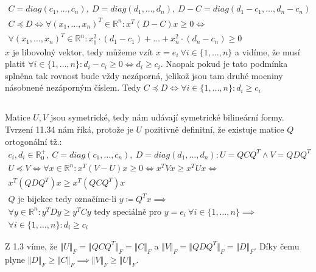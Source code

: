 \documentclass[12pt, a4paper]{article}
\begin{document}
\subsection{}
\begin{gather*}
C = diag(c_1,\dots, c_n),\ D = diag(d_1,\dots, d_n),\ D-C=diag(d_1-c_1,\dots, d_n-c_n)\\
C \preceq D \iff \forall (x_1,\dots, x_n)^T \in \mathbb{R}^n: x^T(D-C)x \geq 0 \iff \\
\forall (x_1,\dots, x_n)^T \in \mathbb{R}^n: x_1^2 \cdot (d_1-c_1) + \dots + x_n^2 \cdot (d_n-c_n) \geq 0
\end{gather*}
$x$ je libovolný vektor, tedy můžeme vzít $x = e_i \ \forall i \in \{1,\dots,n\}$ a vidíme, že musí platit $\forall i \in \{1,\dots,n\}: d_i-c_i \geq 0 \iff d_i \geq c_i$. Naopak pokud je tato podmínka splněna tak rovnost bude vždy nezáporná, jelikož jsou tam druhé mocniny násobnené nezáporným číslem. Tedy $C \preceq D \iff \forall i \in \{1,\dots,n\}: d_i \geq c_i$

\subsection{}
Matice $U,V$ jsou symetrické, tedy nám udávají symetrické bilineární formy. Tvrzení 11.34 nám říká, protože je $U$ pozitivně definitní, že existuje matice $Q$ ortogonální tž.:
\begin{gather*}
c_i, d_i \in \mathbb{R}^+_0, \ C=diag(c_1,\dots, c_n), \ D = diag(d_1,\dots, d_n) : U=QCQ^T \land V = QDQ^T\\
U \preceq V \iff \forall x \in \mathbb{R}^n: x^T(V-U)x \geq 0 \iff x^TVx \geq x^TUx \iff\\
x^T(QDQ^T)x \geq x^T(QCQ^T)x\\
Q \text{ je bijekce tedy označíme-li } y \coloneqq Q^Tx \implies\\
\forall y \in \mathbb{R}^n: y^TDy \geq y^TCy \text{ tedy speciálně pro } y=e_i \ \forall i \in \{1, \dots, n\} \implies\\
\forall i \in \{1, \dots, n\}: d_i \geq c_i 
\end{gather*}

Z 1.3 víme, že $\Vert U \Vert_F = \Vert QCQ^T \Vert_F = \Vert C \Vert_F$ a $\Vert V \Vert_F = \Vert QDQ^T \Vert_F = \Vert D \Vert_F$. Díky čemu plyne $\Vert D \Vert_F \geq \Vert C \Vert_F \implies \Vert V \Vert_F \geq \Vert U \Vert_F$.
\end{document}
